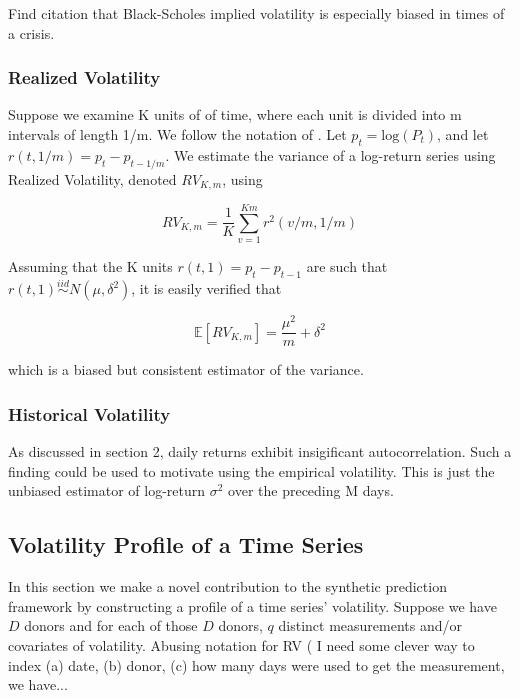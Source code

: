 \documentclass[11pt]{article}
\newcommand{\simiid}{\stackrel{iid}{\sim}} %
\def\E{\mathbb{E}} %
\theoremstyle{definition}
\begin{document}
Find citation that Black-Scholes implied volatility is especially biased in times of a crisis.

\subsubsection{Realized Volatility}

Suppose we examine K units of of time, where each unit is divided into m intervals of length 1/m.  We follow the notation of  \citet{andersen2008realized}. Let $p_{t} = \text{log}(P_{t})$, and let $r(t, 1/m) = p_{t} - p_{t-1/m}$.  We estimate the variance of a log-return series using Realized Volatility, denoted $RV_{K,m}$, using

$$RV_{K,m} = \frac{1}{K}\sum^{Km}_{v=1}r^{2}(v/m,1/m)$$

Assuming that the K units $r(t, 1) = p_{t} - p_{t-1}$ are such that $r(t, 1) \simiid N(\mu, \delta^{2})$, it is easily verified that 

$$\E[RV_{K,m}] = \frac{\mu^{2}}{m} + \delta^{2}$$

which is a biased but consistent estimator of the variance.

\subsubsection{Historical Volatility}

As discussed in section 2, daily returns exhibit insigificant autocorrelation.  Such a finding could be used to motivate using the empirical volatility.  This is just the unbiased estimator of log-return $\sigma^{2}$ over the preceding M days.

\subsection{Volatility Profile of a Time Series}
\label{Volatility Profile of a Time Series}

In this section we make a novel contribution to the synthetic prediction framework by constructing a profile of a time series' volatility.  Suppose we have $D$ donors and for each of those $D$ donors, $q$ distinct measurements and/or covariates of volatility.  Abusing notation for RV ( I need some clever way to index (a) date, (b) donor, (c) how many days were used to get the measurement, we have...
\end{document}
